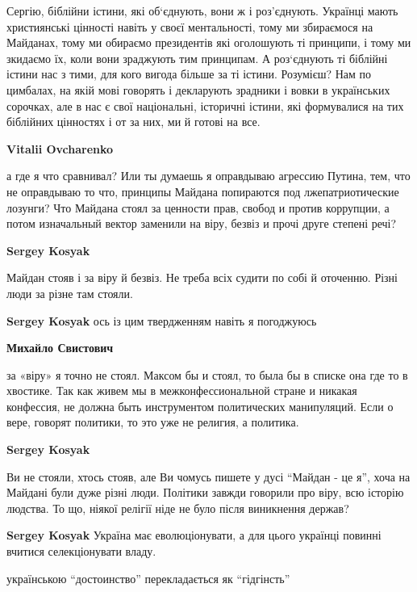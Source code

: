 \begin{itemize}
\begin{itemize}
Сергію, біблійни істини, які об‘єднують, вони ж і роз'єднують. Українці мають
християнські цінності навіть у своєї ментальності, тому ми збираємося на
Майданах, тому ми обираємо президентів які оголошують ті принципи, і тому ми
зкидаємо їх, коли вони зраджують тим принципам. А роз‘єднують ті біблійні
істини нас з тими, для кого вигода більше за ті істини. Розумієш? Нам по
цимбалах, на якій мові говорять і декларують зрадники і вовки в українських
сорочках, але в нас є свої національні, історичні істини, які формувалися на
тих біблійних цінностях і от за них, ми й готові на все.

\textbf{Vitalii Ovcharenko} 

а где я что сравнивал? Или ты думаешь я оправдываю агрессию Путина, тем, что не
оправдываю то что, принципы Майдана попираются под лжепатриотические лозунги?
Что Майдана стоял за ценности прав, свобод и против коррупции, а потом
изначальный вектор заменили на віру, безвіз и прочі друге степені речі?

\textbf{Sergey Kosyak} 

Майдан стояв і за віру й безвіз. Не треба всіх судити по собі й оточенню. Різні
люди за різне там стояли.

\textbf{Sergey Kosyak} ось із цим твердженням навіть я погоджуюсь

\textbf{Михайло Свистович} 

за «віру» я точно не стоял. Максом бы и стоял, то была бы в списке она где то в
хвостике. Так как живем мы в межконфессиональной стране и никакая конфессия, не
должна быть инструментом политических манипуляций. Если о вере, говорят
политики, то это уже не религия, а политика.

\textbf{Sergey Kosyak} 

Ви не стояли, хтось стояв, але Ви чомусь пишете у дусі \enquote{Майдан - це я}, хоча на
Майдані були дуже різні люди. Політики завжди говорили про віру, всю історію
людства. То що, ніякої релігії ніде не було після виникнення держав?

\textbf{Sergey Kosyak} Україна має еволюціонувати, а для цього українці повинні вчитися селекціонувати владу.

\end{itemize} %


українською \enquote{достоинство} перекладається як \enquote{гідгінсть}



\end{itemize} %
